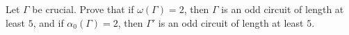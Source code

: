 Let $\Gamma$ be crucial. Prove that if $\omega(\Gamma) = 2$, then $\Gamma$ is an odd circuit of length at least $5$, and if $\alpha_0(\Gamma) = 2$, then $\Gamma'$ is an odd circuit of length at least $5$.
